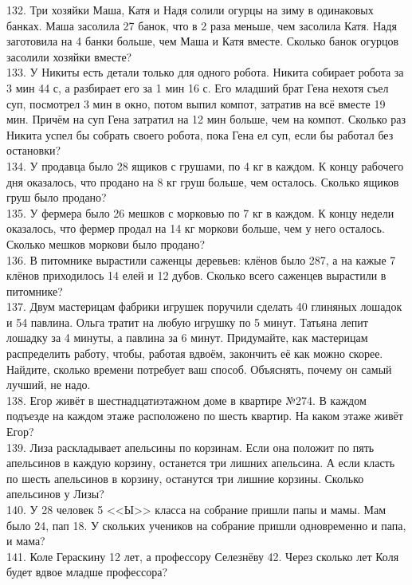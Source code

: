 132. Три хозяйки Маша, Катя и Надя солили огурцы на зиму в одинаковых банках. Маша засолила 27 банок, что в 2 раза меньше, чем засолила Катя. Надя заготовила на 4 банки больше, чем Маша и Катя вместе. Сколько банок огурцов засолили хозяйки вместе?\\
133. У Никиты есть детали только для одного робота. Никита собирает робота за 3 мин 44 с, а разбирает его за 1 мин 16 с. Его младший брат Гена нехотя съел суп, посмотрел 3 мин в окно, потом выпил компот, затратив на всё вместе 19 мин. Причём на суп Гена затратил на 12 мин больше, чем на компот. Сколько раз Никита успел бы собрать своего робота, пока Гена ел суп, если бы работал без остановки?\\
134. У продавца было 28 ящиков с грушами, по 4 кг в каждом. К концу рабочего дня оказалось, что продано на 8 кг груш больше, чем осталось. Сколько ящиков груш было продано?\\
135. У фермера было 26 мешков с морковью по 7 кг в каждом. К концу недели оказалось, что фермер продал на 14 кг моркови больше, чем у него осталось. Сколько мешков моркови было продано?\\
136. В питомнике вырастили саженцы деревьев: клёнов было 287, а на кажые 7 клёнов приходилось 14 елей и 12 дубов. Сколько всего саженцев вырастили в питомнике?\\
137. Двум мастерицам фабрики игрушек поручили сделать 40 глиняных лошадок и 54 павлина. Ольга тратит на любую игрушку по 5 минут. Татьяна лепит лошадку за 4 минуты, а павлина за 6 минут. Придумайте, как мастерицам распределить работу, чтобы, работая вдвоём, закончить её как можно скорее. Найдите, сколько времени потребует ваш способ. Объяснять, почему он самый лучший, не надо.\\
138. Егор живёт в шестнадцатиэтажном доме в квартире №274. В каждом подъезде на каждом этаже расположено по шесть квартир. На каком этаже живёт Егор?\\
139. Лиза раскладывает апельсины по корзинам. Если она положит по пять апельсинов в каждую корзину, останется три лишних апельсина. А если класть по шесть апельсинов в корзину, останутся три лишние корзины. Сколько апельсинов у Лизы?\\
140. У 28 человек 5 <<Ы>> класса на собрание пришли папы и мамы. Мам было 24, пап 18. У скольких учеников на собрание пришли одновременно и папа, и мама?\\
141. Коле Гераскину 12 лет, а профессору Селезнёву 42. Через сколько лет Коля будет вдвое младше профессора?\\
